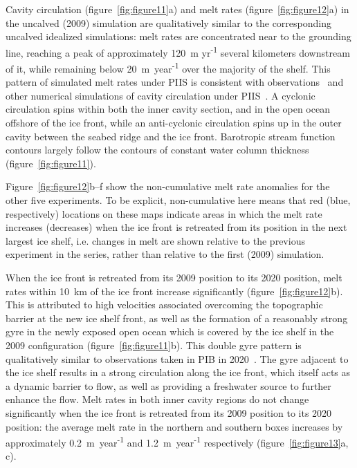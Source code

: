 \documentclass[draft]{agujournal2019}
\begin{document}
Cavity circulation (figure~\ref{fig:figure11}a) and melt rates (figure~\ref{fig:figure12}a) in the uncalved (2009) simulation are qualitatively similar to the corresponding uncalved idealized simulations: melt rates are concentrated near to the grounding line, reaching a peak of approximately 120~m yr\textsuperscript{-1} several kilometers downstream of it, while remaining below 20~m~year\textsuperscript{-1} over the majority of the shelf. This pattern of simulated melt rates under PIIS is consistent with observations~\cite{Dutrieux2013Cryosphere} and other numerical simulations of cavity circulation under PIIS~\cite[for example]{Heimbach2012AnnGlac}. A cyclonic circulation spins within both  the inner cavity section, and in the open ocean offshore of the ice front, while an anti-cyclonic circulation spins up in the outer cavity between the seabed ridge and the ice front. Barotropic stream function contours largely follow the contours of constant water column thickness (figure~\ref{fig:figure11}).

Figure~\ref{fig:figure12}b--f show the non-cumulative melt rate anomalies for the other five experiments. To be explicit, non-cumulative here means that red (blue, respectively) locations on these maps indicate areas in which the melt rate increases (decreases) when the ice front is retreated from its position in the next largest ice shelf, i.e. changes in melt are shown relative to the previous experiment in the series, rather than relative to the first (2009) simulation.

When the ice front is retreated from its 2009 position to its 2020 position, melt rates within 10~km of the ice front increase significantly (figure~\ref{fig:figure12}b). This is attributed to high velocities associated overcoming the topographic barrier at the new ice shelf front, as well as the formation of a reasonably strong gyre in the newly exposed open ocean which is covered by the ice shelf in the 2009 configuration (figure~\ref{fig:figure11}b). This double gyre pattern is qualitatively similar to observations taken in PIB in 2020~\cite{Yoon2022NatureComms}. The gyre adjacent to the ice shelf results in a strong circulation along the ice front, which itself acts as a dynamic barrier to flow, as well as providing a freshwater source to further enhance the flow. Melt rates in both inner cavity regions do not change significantly when the ice front is retreated from its 2009 position to its 2020 position: the average melt rate in the northern and southern boxes increases by approximately 0.2~m~year\textsuperscript{-1} and 1.2~m~year\textsuperscript{-1} respectively (figure~\ref{fig:figure13}a, c).
\end{document}
